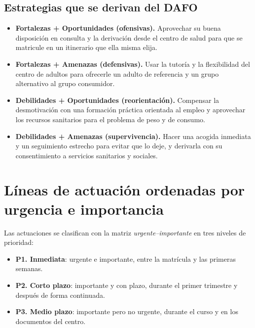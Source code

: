 \documentclass[11pt,a4paper]{article}
\newcommand{\prio}[1]{\textbf{\color{acento}#1}}
\begin{document}
\subsection*{Estrategias que se derivan del DAFO}
\begin{itemize}
  \item \textbf{Fortalezas + Oportunidades (ofensivas).} Aprovechar su buena
  disposición en consulta y la derivación desde el centro de salud para que se
  matricule en un itinerario que ella misma elija.
  \item \textbf{Fortalezas + Amenazas (defensivas).} Usar la tutoría y la
  flexibilidad del centro de adultos para ofrecerle un adulto de referencia y
  un grupo alternativo al grupo consumidor.
  \item \textbf{Debilidades + Oportunidades (reorientación).} Compensar la
  desmotivación con una formación práctica orientada al empleo y aprovechar los
  recursos sanitarios para el problema de peso y de consumo.
  \item \textbf{Debilidades + Amenazas (supervivencia).} Hacer una acogida
  inmediata y un seguimiento estrecho para evitar que lo deje, y derivarla con
  su consentimiento a servicios sanitarios y sociales.
\end{itemize}

\section{Líneas de actuación ordenadas por urgencia e importancia}
Las actuaciones se clasifican con la matriz \emph{urgente--importante} en tres
niveles de prioridad:
\begin{itemize}[itemsep=0pt]
  \item \prio{P1. Inmediata}: urgente e importante, entre la matrícula y las
  primeras semanas.
  \item \prio{P2. Corto plazo}: importante y con plazo, durante el primer
  trimestre y después de forma continuada.
  \item \prio{P3. Medio plazo}: importante pero no urgente, durante el curso y
  en los documentos del centro.
\end{itemize}
\end{document}
